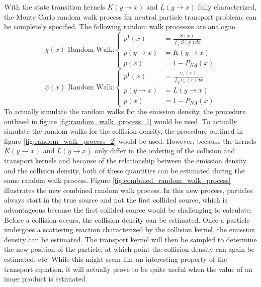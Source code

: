 With the state transition kernels $K(y \to x)$ and $L(y \to x)$ fully 
characterized, the Monte Carlo random walk process for neutral particle 
transport problems can be completely specified. The following random walk
processes are analogue.
\begin{equation}
  \chi(x)\text{ Random Walk:}
  \begin{cases}
    p^1(x) & = \frac{S(x)}{\int_{\Gamma} S(x)dx} \\
    p(y \to x) &  = K(y \to x) \\
    p(x) & = 1 - P_{NA}(x)
  \end{cases}
  \label{eq:mc_random_walk_emission_dens}
\end{equation}
\begin{equation}
  \psi(x)\text{ Random Walk:}
  \begin{cases}
    p^1(x) & = \frac{\psi_1(x)}{\int_{\Gamma}\psi_1(x)dx} \\
    p(y \to x) & = L(y \to x) \\
    p(x) & = 1 - P_{NA}(x)
  \end{cases}
  \label{eq:mc_random_walk_collision_dens}
\end{equation}
To actually simulate the random walks for the emission density, the procedure
outlined in figure \ref{fig:random_walk_process_1} would be used. To
actually simulate the random walks for the collision density, the procedure
outlined in figure \ref{fig:random_walk_process_2} would be used. However,
because the kernels $K(y \to x)$ and $L(y \to x)$ only differ in the ordering
of the collision and transport kernels and because of the relationship between
the emission density and the collision density, both of these quantities can
be estimated during the same random walk process. Figure 
\ref{fig:combined_random_walk_process} illustrates the new combined random
walk process. In this new process, particles always start in the true source
and not the first collided source, which is advantageous because the first 
collided source would be challenging to calculate. Before a collision occurs,
the collision density can be estimated. Once a particle undergoes a scattering
reaction characterized by the collision kernel, the emission density can be
estimated. The transport kernel will then be sampled to determine the new
position of the particle, at which point the collision density can again be
estimated, etc. While this might seem like an interesting property of the 
transport equation, it will actually prove to be quite useful when the value
of an inner product is estimated.

